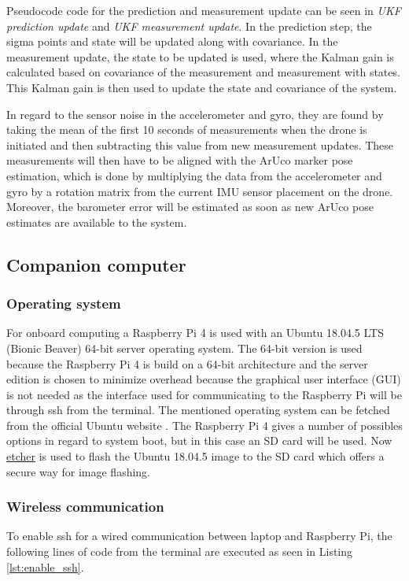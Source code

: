 \documentclass[../Head/report.tex]{subfiles}
\begin{document}
Pseudocode code for the prediction and measurement update can be seen in \textit{UKF prediction update} and \textit{UKF measurement update}. In the prediction step, the sigma points and state will be updated along with covariance. In the measurement update, the state to be updated is used, where the Kalman gain is calculated based on covariance of the measurement and measurement with states. This Kalman gain is then used to update the state and covariance of the system. 

In regard to the sensor noise in the accelerometer and gyro, they are found by taking the mean of the first 10 seconds of measurements when the drone is initiated and then subtracting this value from new measurement updates. These measurements will then have to be aligned with the ArUco marker pose estimation, which is done by multiplying the data from the accelerometer and gyro by a rotation matrix from the current IMU sensor placement on the drone. Moreover, the barometer error will be estimated as soon as new ArUco pose estimates are available to the system.  

\subsection{Companion computer}
\label{sec:companion_computer}

\subsubsection{Operating system}


For onboard computing a Raspberry Pi 4 is used with an Ubuntu 18.04.5 LTS (Bionic Beaver) 64-bit server operating system. The 64-bit version is used because the Raspberry Pi 4 is build on a 64-bit architecture and the server edition is chosen to minimize overhead because the graphical user interface (GUI) is not needed as the interface used for communicating to the Raspberry Pi will be through ssh from the terminal. The mentioned operating system can be fetched from the official Ubuntu website \cite{ubuntuImage}. The Raspberry Pi 4 gives a number of possibles options in regard to system boot, but in this case an SD card will be used. Now  \href{https://www.balena.io/etcher/}{etcher} is used to flash the Ubuntu 18.04.5 image to the SD card which offers a secure way for image flashing. 

\subsubsection{Wireless communication}
To enable ssh for a wired communication between laptop and Raspberry Pi, the following lines of code from the terminal are executed as seen in Listing \ref{lst:enable_ssh}.      
\end{document}
